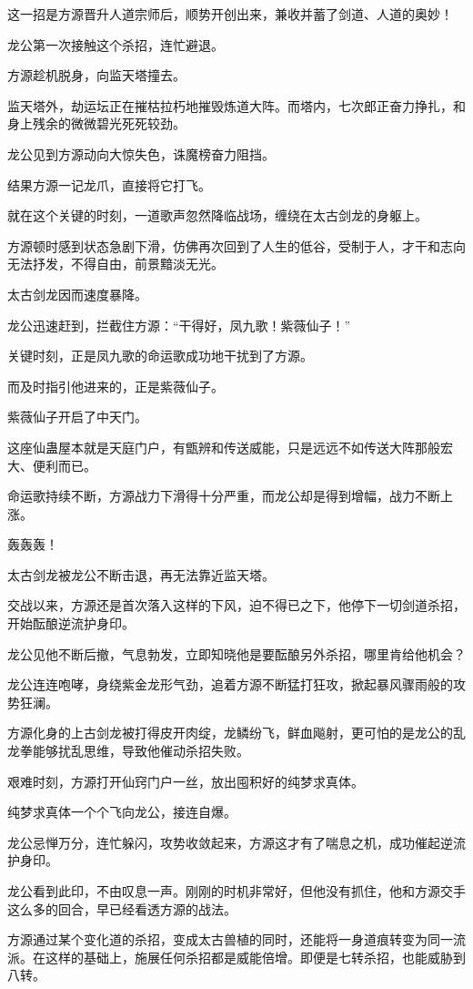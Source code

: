 \begin{this_body}
这一招是方源晋升人道宗师后，顺势开创出来，兼收并蓄了剑道、人道的奥妙！

龙公第一次接触这个杀招，连忙避退。

方源趁机脱身，向监天塔撞去。

监天塔外，劫运坛正在摧枯拉朽地摧毁炼道大阵。而塔内，七次郎正奋力挣扎，和身上残余的微微碧光死死较劲。

龙公见到方源动向大惊失色，诛魔榜奋力阻挡。

结果方源一记龙爪，直接将它打飞。

就在这个关键的时刻，一道歌声忽然降临战场，缠绕在太古剑龙的身躯上。

方源顿时感到状态急剧下滑，仿佛再次回到了人生的低谷，受制于人，才干和志向无法抒发，不得自由，前景黯淡无光。

太古剑龙因而速度暴降。

龙公迅速赶到，拦截住方源：“干得好，凤九歌！紫薇仙子！”

关键时刻，正是凤九歌的命运歌成功地干扰到了方源。

而及时指引他进来的，正是紫薇仙子。

紫薇仙子开启了中天门。

这座仙蛊屋本就是天庭门户，有甑辨和传送威能，只是远远不如传送大阵那般宏大、便利而已。

命运歌持续不断，方源战力下滑得十分严重，而龙公却是得到增幅，战力不断上涨。

轰轰轰！

太古剑龙被龙公不断击退，再无法靠近监天塔。

交战以来，方源还是首次落入这样的下风，迫不得已之下，他停下一切剑道杀招，开始酝酿逆流护身印。

龙公见他不断后撤，气息勃发，立即知晓他是要酝酿另外杀招，哪里肯给他机会？

龙公连连咆哮，身绕紫金龙形气劲，追着方源不断猛打狂攻，掀起暴风骤雨般的攻势狂澜。

方源化身的上古剑龙被打得皮开肉绽，龙鳞纷飞，鲜血飚射，更可怕的是龙公的乱龙拳能够扰乱思维，导致他催动杀招失败。

艰难时刻，方源打开仙窍门户一丝，放出囤积好的纯梦求真体。

纯梦求真体一个个飞向龙公，接连自爆。

龙公忌惮万分，连忙躲闪，攻势收敛起来，方源这才有了喘息之机，成功催起逆流护身印。

龙公看到此印，不由叹息一声。刚刚的时机非常好，但他没有抓住，他和方源交手这么多的回合，早已经看透方源的战法。

方源通过某个变化道的杀招，变成太古兽植的同时，还能将一身道痕转变为同一流派。在这样的基础上，施展任何杀招都是威能倍增。即便是七转杀招，也能威胁到八转。


\end{this_body}
